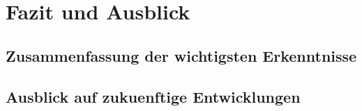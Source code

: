 \section{Fazit und Ausblick}
\label{sec:fazit}
\subsection{Zusammenfassung der wichtigsten Erkenntnisse}
\label{subsec:zusammenfassung}
\subsection{Ausblick auf zukuenftige Entwicklungen}
\label{subsec:ausblick}
